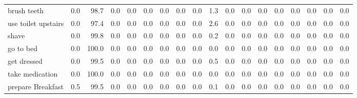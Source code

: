\documentclass{article}
\begin{document}
\begin{sideways}
\begin{tabular}{lrrrrrrrrrrrrrrrrr}
brush teeth           &         0.0 &               98.7 &           0.0 &                          0.0 &                0.0 &                0.0 &                        0.0 &          0.0 &              1.3 &                0.0 &                    0.0 &                      0.0 &                  0.0 &                   0.0 &              0.0 &              0.0 &          0.0 \\
use toilet upstairs   &         0.0 &               97.4 &           0.0 &                          0.0 &                0.0 &                0.0 &                        0.0 &          0.0 &              2.6 &                0.0 &                    0.0 &                      0.0 &                  0.0 &                   0.0 &              0.0 &              0.0 &          0.0 \\
shave                 &         0.0 &               99.8 &           0.0 &                          0.0 &                0.0 &                0.0 &                        0.0 &          0.0 &              0.2 &                0.0 &                    0.0 &                      0.0 &                  0.0 &                   0.0 &              0.0 &              0.0 &          0.0 \\
go to bed             &         0.0 &              100.0 &           0.0 &                          0.0 &                0.0 &                0.0 &                        0.0 &          0.0 &              0.0 &                0.0 &                    0.0 &                      0.0 &                  0.0 &                   0.0 &              0.0 &              0.0 &          0.0 \\
get dressed           &         0.0 &               99.5 &           0.0 &                          0.0 &                0.0 &                0.0 &                        0.0 &          0.0 &              0.5 &                0.0 &                    0.0 &                      0.0 &                  0.0 &                   0.0 &              0.0 &              0.0 &          0.0 \\
take medication       &         0.0 &              100.0 &           0.0 &                          0.0 &                0.0 &                0.0 &                        0.0 &          0.0 &              0.0 &                0.0 &                    0.0 &                      0.0 &                  0.0 &                   0.0 &              0.0 &              0.0 &          0.0 \\
prepare Breakfast     &         0.5 &               99.5 &           0.0 &                          0.0 &                0.0 &                0.0 &                        0.0 &          0.0 &              0.1 &                0.0 &                    0.0 &                      0.0 &                  0.0 &                   0.0 &              0.0 &              0.0 &          0.0 \\

\end{tabular}
\end{sideways}
\end{document}

